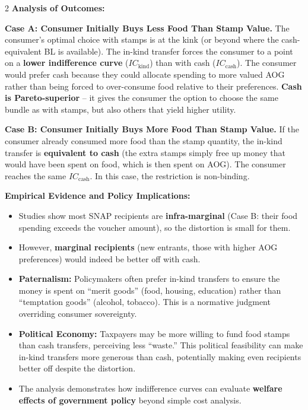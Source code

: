\documentclass[10pt,a4paper]{article}
\begin{document}
\begin{multicols}{2}
\textbf{Analysis of Outcomes:}

\textbf{Case A: Consumer Initially Buys Less Food Than Stamp Value.}
The consumer's optimal choice with stamps is at the kink (or beyond where the cash-equivalent BL is available). The in-kind transfer forces the consumer to a point on a \textbf{lower indifference curve} ($IC_{\text{kind}}$) than with cash ($IC_{\text{cash}}$). The consumer would prefer cash because they could allocate spending to more valued AOG rather than being forced to over-consume food relative to their preferences. \textbf{Cash is Pareto-superior} -- it gives the consumer the option to choose the same bundle as with stamps, but also others that yield higher utility.

\textbf{Case B: Consumer Initially Buys More Food Than Stamp Value.}
If the consumer already consumed more food than the stamp quantity, the in-kind transfer is \textbf{equivalent to cash} (the extra stamps simply free up money that would have been spent on food, which is then spent on AOG). The consumer reaches the same $IC_{\text{cash}}$. In this case, the restriction is non-binding.

\textbf{Empirical Evidence and Policy Implications:}
\begin{itemize}[leftmargin=*,nosep]
    \item Studies show most SNAP recipients are \textbf{infra-marginal} (Case B: their food spending exceeds the voucher amount), so the distortion is small for them.
    \item However, \textbf{marginal recipients} (new entrants, those with higher AOG preferences) would indeed be better off with cash.
    \item \textbf{Paternalism:} Policymakers often prefer in-kind transfers to ensure the money is spent on ``merit goods'' (food, housing, education) rather than ``temptation goods'' (alcohol, tobacco). This is a normative judgment overriding consumer sovereignty.
    \item \textbf{Political Economy:} Taxpayers may be more willing to fund food stamps than cash transfers, perceiving less ``waste.'' This political feasibility can make in-kind transfers more generous than cash, potentially making even recipients better off despite the distortion.
    \item The analysis demonstrates how indifference curves can evaluate \textbf{welfare effects of government policy} beyond simple cost analysis.
\end{itemize}


\end{multicols}
\end{document}
